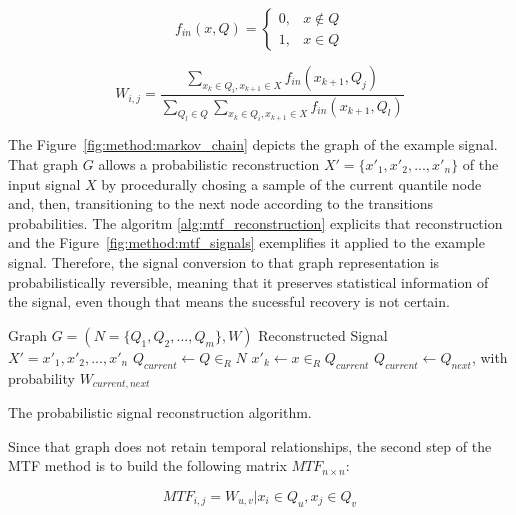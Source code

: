 \begin{equation}
	f_{in}(x,Q) = \begin{cases}
		0, & x \not\in Q \\
		1, & x \in Q
	\end{cases}
\end{equation}

\begin{equation}
    W_{i,j} = \frac{
            \sum\limits_{x_k \in Q_i, x_{k+1} \in X} f_{in}(x_{k+1}, Q_j)
        }{
            \sum\limits_{Q_l \in Q}\sum\limits_{x_k \in Q_i, x_{k+1} \in X} f_{in}(x_{k+1}, Q_l) 
        }
\end{equation}



\noindent The Figure~\ref{fig:method:markov_chain} depicts the graph of the example signal. That graph $G$ allows a probabilistic reconstruction $X' = \{ x'_1,x'_2,...,x'_n \}$ of the input signal $X$ by procedurally chosing a sample of the current quantile node and, then, transitioning to the next node according to the transitions probabilities. The algoritm \ref{alg:mtf_reconstruction} explicits that reconstruction and the Figure~\ref{fig:method:mtf_signals} exemplifies it applied to the example signal. Therefore, the signal conversion to that graph representation is probabilistically reversible, meaning that it preserves statistical information of the signal, even though that means the sucessful recovery is not certain.

\begin{algorithm}
    \begin{algorithmic}
        \Require Graph $G=(N=\{Q_1, Q_2, ..., Q_m\},W)$
        \Ensure Reconstructed Signal $X'=x'_1,x'_2,...,x'_n$
        \State $Q_{current} \gets Q \in_R N$ 
            \State $x'_k \gets x \in_R Q_{current}$
            \State $Q_{current} \gets Q_{next}$, with probability $W_{current,next}$
        \EndFor
    \end{algorithmic}
    \caption{The probabilistic signal reconstruction algorithm. }
    \label{alg:mtf_reconstruction}
\end{algorithm}

Since that graph does not retain temporal relationships, the second step of the \gls{MTF} method is to build the following matrix $MTF_{n \times n}$: 

\begin{equation}
    MTF_{i,j} = W_{u,v} | x_i \in Q_u, x_j \in Q_v
\end{equation}

